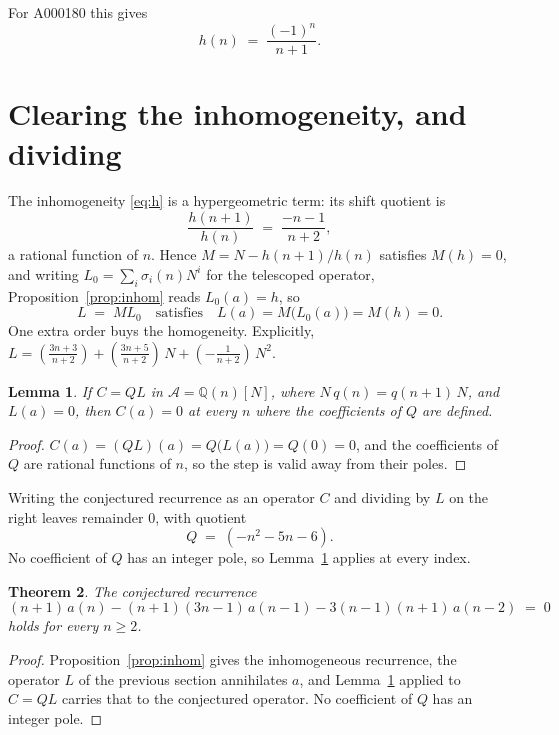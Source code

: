 \documentclass[11pt,a4paper]{article}
\theoremstyle{plain}
\newtheorem{theorem}{Theorem}
\newtheorem{lemma}[theorem]{Lemma}
\theoremstyle{definition}
\begin{document}
For A000180 this gives
\begin{equation}\label{eq:h}
h(n)\;=\;\frac{\left(-1\right)^{n}}{n + 1} .
\end{equation}

\section{Clearing the inhomogeneity, and dividing}

The inhomogeneity \eqref{eq:h} is a hypergeometric term: its shift quotient is
\[
\frac{h(n+1)}{h(n)}\;=\;\frac{- n - 1}{n + 2},
\]
a rational function of $n$. Hence $M=N-h(n+1)/h(n)$ satisfies $M(h)=0$, and writing $L_{0}=\sum_{i}\sigma_{i}(n)N^{i}$ for the telescoped operator, Proposition~\ref{prop:inhom} reads $L_{0}(a)=h$, so
\[
L\;=\;ML_{0}\quad\text{satisfies}\quad L(a)=M\bigl(L_{0}(a)\bigr)=M(h)=0 .
\]
One extra order buys the homogeneity. Explicitly, $L=\left(\frac{3 n + 3}{n + 2}\right) + \left(\frac{3 n + 5}{n + 2}\right)\,N + \left(- \frac{1}{n + 2}\right)\,N^{2}$.

\begin{lemma}\label{lem:factor}
If $C=QL$ in $\mathcal{A}=\mathbb{Q}(n)[N]$, where $N\,q(n)=q(n+1)\,N$, and $L(a)=0$, then
$C(a)=0$ at every $n$ where the coefficients of $Q$ are defined.
\end{lemma}

\begin{proof}
$C(a)=(QL)(a)=Q\bigl(L(a)\bigr)=Q(0)=0$, and the coefficients of $Q$ are rational functions
of $n$, so the step is valid away from their poles.
\end{proof}

Writing the conjectured recurrence as an operator $C$ and dividing by $L$ on the right
leaves remainder $0$, with quotient
\[
Q\;=\;\left(- n^{2} - 5 n - 6\right) .
\]
No coefficient of $Q$ has an integer pole, so Lemma~\ref{lem:factor} applies at every index.

\begin{theorem}
The conjectured recurrence
\[
(n + 1)\,a(n) -  \left(n + 1\right) \left(3 n - 1\right)\,a(n-1) -  3 \left(n - 1\right) \left(n + 1\right)\,a(n-2) \;=\;0
\]
holds for every $n\ge2$.
\end{theorem}

\begin{proof}
Proposition~\ref{prop:inhom} gives the inhomogeneous recurrence, the operator $L$ of the
previous section annihilates $a$, and Lemma~\ref{lem:factor} applied to $C=QL$ carries that
to the conjectured operator. No coefficient of $Q$ has an integer pole.
\end{proof}
\end{document}
